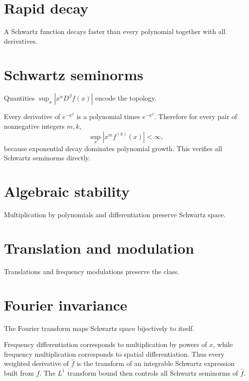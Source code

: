 \section{Rapid decay}
A Schwartz function decays faster than every polynomial together with all derivatives.

\section{Schwartz seminorms}
Quantities $\sup_x|x^\alpha D^\beta f(x)|$ encode the topology.


\begin{example}\label{ex:iii14-expand-01}
Every derivative of \(e^{-x^2}\) is a polynomial times \(e^{-x^2}\).
Therefore for every pair of nonnegative integers \(m,k\),
\[
\sup_x |x^m f^{(k)}(x)|<\infty,
\]
because exponential decay dominates polynomial growth. This verifies all
Schwartz seminorms directly.
\end{example}
\section{Algebraic stability}
Multiplication by polynomials and differentiation preserve Schwartz space.

\section{Translation and modulation}
Translations and frequency modulations preserve the class.

\section{Fourier invariance}
The Fourier transform maps Schwartz space bijectively to itself.


\begin{example}\label{ex:iii14-expand-02}
Frequency differentiation corresponds to multiplication by powers of \(x\),
while frequency multiplication corresponds to spatial differentiation. Thus
every weighted derivative of \(\widehat f\) is the transform of an integrable
Schwartz expression built from \(f\). The \(L^1\) transform bound then controls
all Schwartz seminorms of \(\widehat f\).
\end{example}
